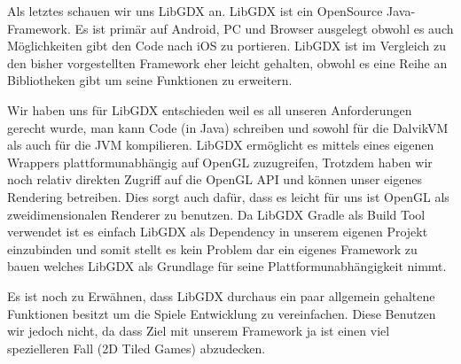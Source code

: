 Als letztes schauen wir uns LibGDX an. LibGDX ist ein OpenSource Java-Framework. Es ist primär auf Android, PC und Browser ausgelegt obwohl es auch Möglichkeiten gibt den Code nach iOS zu portieren. LibGDX ist im Vergleich zu den bisher vorgestellten Framework eher leicht gehalten, obwohl es eine Reihe an Bibliotheken gibt um seine Funktionen zu erweitern.

Wir haben uns für LibGDX entschieden weil es all unseren Anforderungen gerecht wurde, man kann Code (in Java) schreiben und sowohl für die DalvikVM als auch für die JVM kompilieren. LibGDX ermöglicht es mittels eines eigenen Wrappers plattformunabhängig auf OpenGL zuzugreifen, Trotzdem haben wir noch relativ direkten Zugriff auf die OpenGL API und können unser eigenes Rendering betreiben. Dies sorgt auch dafür, dass es leicht für uns ist OpenGL als zweidimensionalen Renderer zu benutzen.
Da LibGDX Gradle als Build Tool verwendet ist es einfach LibGDX als Dependency in unserem eigenen Projekt einzubinden und somit stellt es kein Problem dar ein eigenes Framework zu bauen welches LibGDX als Grundlage für seine Plattformunabhängigkeit nimmt.

Es ist noch zu Erwähnen, dass LibGDX durchaus ein paar allgemein gehaltene Funktionen besitzt um die Spiele Entwicklung zu vereinfachen. Diese Benutzen wir jedoch nicht, da dass Ziel mit unserem Framework ja ist einen viel spezielleren Fall (2D Tiled Games) abzudecken.